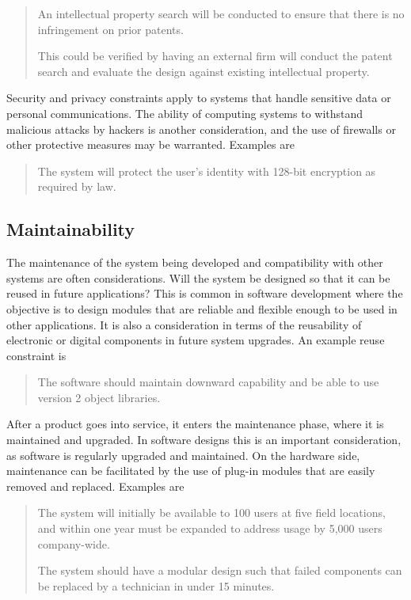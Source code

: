 \begin{quote}
An intellectual property search will be conducted to ensure that there
is no infringement on prior patents.

This could be verified by having an external firm will conduct the
patent search and evaluate the design against existing intellectual
property.
\end{quote}

Security and privacy constraints apply to systems that handle sensitive
data or personal communications. The ability of computing systems to
withstand malicious attacks by hackers is another consideration, and the
use of firewalls or other protective measures may be warranted. Examples
are

\begin{quote}
The system will protect the user's identity with 128-bit encryption as
required by law.
\end{quote}

\subsection*{Maintainability}
\label{section:maintainability}

The maintenance of the system being developed and compatibility with
other systems are often considerations. Will the system be designed so
that it can be reused in future applications? This is common in software
development where the objective is to design modules that are reliable
and flexible enough to be used in other applications. It is also a
consideration in terms of the reusability of electronic or digital
components in future system upgrades. An example reuse constraint is

\begin{quote}
The software should maintain downward capability and be able to use
version 2 object libraries.
\end{quote}

After a product goes into service, it enters the maintenance phase,
where it is maintained and upgraded. In software designs this is an
important consideration, as software is regularly upgraded and
maintained. On the hardware side, maintenance can be facilitated by the
use of plug-in modules that are easily removed and replaced. Examples
are

\begin{quote}
The system will initially be available to 100 users at five field
locations, and within one year must be expanded to address usage by
5,000 users company-wide.

The system should have a modular design such that failed components can
be replaced by a technician in under 15 minutes.
\end{quote}

